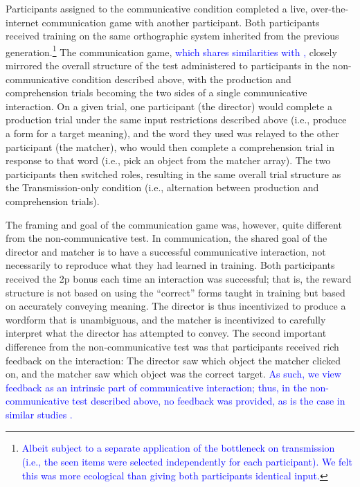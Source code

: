 \documentclass[doc,biblatex]{apa7}
\newcommand\newmaterial[1]{\textcolor{blue}{#1}}
\begin{document}
Participants assigned to the communicative condition completed a live, over-the-internet communication game with another participant. Both participants received training on the same orthographic system inherited from the previous generation.\footnote{\newmaterial{Albeit subject to a separate application of the bottleneck on transmission (i.e., the seen items were selected independently for each participant). We felt this was more ecological than giving both participants identical input.}} The communication game, \newmaterial{which shares similarities with \textcite{Kirby:2015},} closely mirrored the overall structure of the test administered to participants in the non-communicative condition described above, with the production and comprehension trials becoming the two sides of a single communicative interaction. On a given trial, one participant (the director) would complete a production trial under the same input restrictions described above (i.e., produce a form for a target meaning), and the word they used was relayed to the other participant (the matcher), who would then complete a comprehension trial in response to that word (i.e., pick an object from the matcher array). The two participants then switched roles, resulting in the same overall trial structure as the Transmission-only condition (i.e., alternation between production and comprehension trials).

The framing and goal of the communication game was, however, quite different from the non-communicative test. In communication, the shared goal of the director and matcher is to have a successful communicative interaction, not necessarily to reproduce what they had learned in training. Both participants received the 2p bonus each time an interaction was successful; that is, the reward structure is not based on using the ``correct'' forms taught in training but based on accurately conveying meaning. The director is thus incentivized to produce a wordform that is unambiguous, and the matcher is incentivized to carefully interpret what the director has attempted to convey. The second important difference from the non-communicative test was that participants received rich feedback on the interaction: The director saw which object the matcher clicked on, and the matcher saw which object was the correct target. \newmaterial{As such, we view feedback as an intrinsic part of communicative interaction; thus, in the non-communicative test described above, no feedback was provided, as is the case in similar studies \parencite{Carr:2017, Motamedi:2019, Saldana:2019, Silvey:2019}.}
\end{document}
